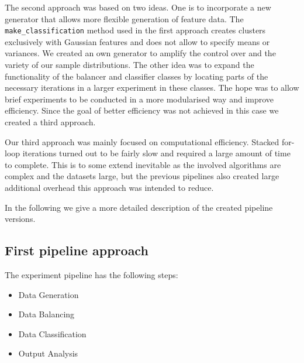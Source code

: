 The second approach was based on two ideas. One is to incorporate a new generator that allows more flexible generation of feature data.
The \texttt{make\_classification} method used in the first approach creates clusters exclusively with Gaussian features and does not allow to specify means or variances.
We created an own generator to amplify the control over and the variety of our sample distributions.
The other idea was to expand the functionality of the balancer and classifier classes by locating parts of the necessary iterations in a larger experiment in these classes.
The hope was to allow brief experiments to be conducted in a more modularised way and improve efficiency.
Since the goal of better efficiency was not achieved in this case we created a third approach.

Our third approach was mainly focused on computational efficiency. 
Stacked for-loop iterations turned out to be fairly slow and required a large amount of time to complete.
This is to some extend inevitable as the involved algorithms are complex and the datasets large, 
but the previous pipelines also created large additional overhead this approach was intended to reduce.

In the following we give a more detailed description of the created pipeline versions.

\subsection{First pipeline approach}


The experiment pipeline has the following steps:

\begin{itemize}
\item
  Data Generation
\item
  Data Balancing
\item
  Data Classification
\item
  Output Analysis
\end{itemize}

